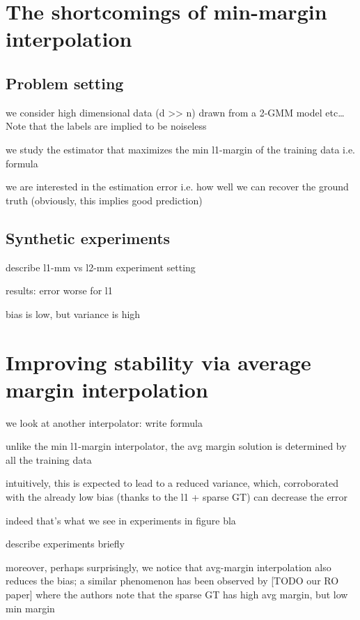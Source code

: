 \section{The shortcomings of min-margin interpolation}

\subsection{Problem setting}

we consider high dimensional data (d >> n) drawn from a 2-GMM model etc… Note that the labels are implied to be noiseless

we study the estimator that maximizes the min l1-margin of the training data i.e. formula

we are interested in the estimation error i.e. how well we can recover the ground truth (obviously, this implies good prediction)

\subsection{Synthetic experiments}

describe l1-mm vs l2-mm experiment setting

results: error worse for l1

bias is low, but variance is high 

\section{Improving stability via average margin interpolation}

we look at another interpolator: write formula

unlike the min l1-margin interpolator, the avg margin solution is determined by all the training data

intuitively, this is expected to lead to a reduced variance, which, corroborated with the already low bias (thanks to the l1 + sparse GT) can decrease the error

indeed that’s what we see in experiments in figure bla

describe experiments briefly

moreover, perhaps surprisingly, we notice that avg-margin interpolation also
reduces the bias; a similar phenomenon has been observed by [TODO our RO paper]
where the authors note that the sparse GT has high avg margin, but low min
margin

